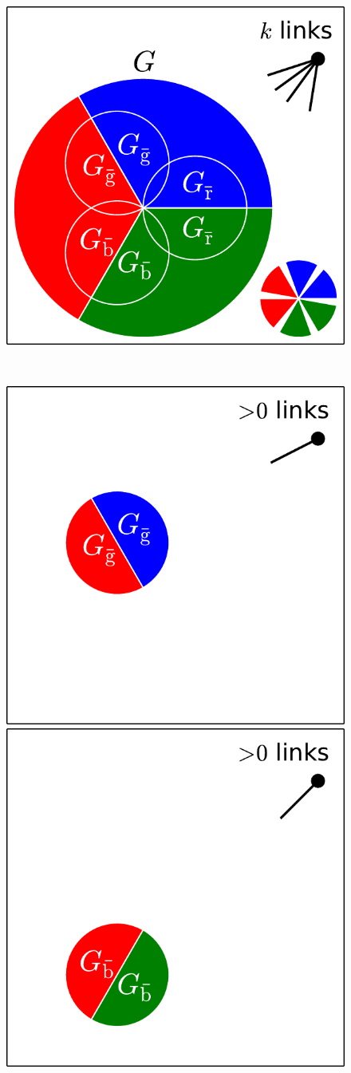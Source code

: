 \documentclass[aps, pre, onecolumn, a4paper, floatfix]{revtex4}
\begin{document}
\begin{figure}[htb]
  \begin{minipage}[b]{0.245\linewidth}
    \begin{center}
    \includegraphics[width=0.99\columnwidth]{sets_k_all.pdf}
   \end{center}
  \end{minipage}
  \begin{minipage}[b]{0.1\linewidth}
    \ 
  \end{minipage}
  \begin{minipage}[b]{0.6\linewidth}
    \begin{center}
    \includegraphics[height=0.4\columnwidth]{sets_k_gc_no_2.pdf}
     \hspace{-1mm}
    \includegraphics[trim=100 0 0 0,clip,height=0.4\columnwidth]{sets_k_gc_no_3.pdf}

\end{center}
\end{minipage}
\end{figure}
\end{document}
